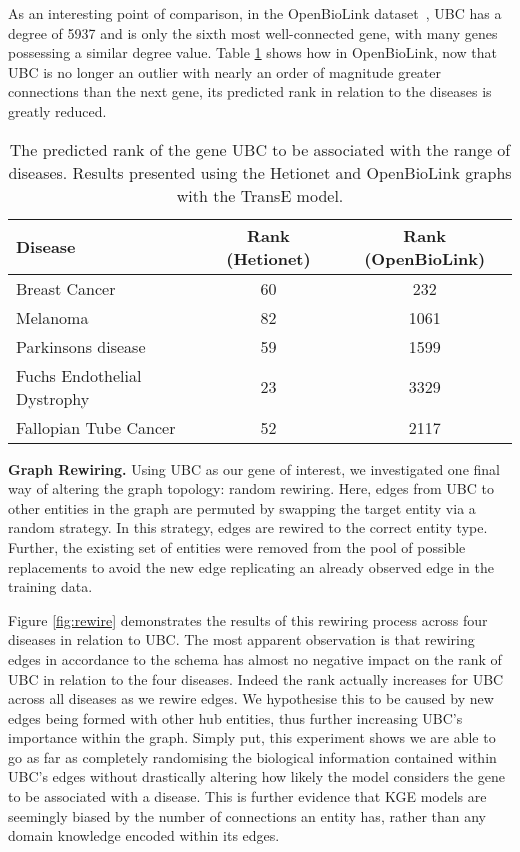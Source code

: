 As an interesting point of comparison, in the OpenBioLink dataset~\cite{breit2020openbiolink}, UBC has a degree of 5937 and is only the sixth most well-connected gene, with many genes possessing a similar degree value. Table \ref{tab:ubc-rank} shows how in OpenBioLink, now that UBC is no longer an outlier with nearly an order of magnitude greater connections than the next gene, its predicted rank in relation to the diseases is greatly reduced.

\begin{table}[ht!]
	\centering
	\begin{tabular}{l c c}
		\toprule
		\textbf{Disease}            & \textbf{Rank (Hetionet)} & \textbf{Rank (OpenBioLink)} \\ \midrule \midrule
		Breast Cancer               & 60                       & 232                         \\
		Melanoma                    & 82                       & 1061                        \\
		Parkinsons disease          & 59                       & 1599                        \\
		Fuchs Endothelial Dystrophy & 23                       & 3329                        \\
		Fallopian Tube Cancer       & 52                       & 2117                        \\
		\bottomrule
	\end{tabular}
	\vspace{5pt}
	\caption{The predicted rank of the gene UBC to be associated with the range of diseases. Results presented using the Hetionet and OpenBioLink graphs with the TransE model.}
	\label{tab:ubc-rank}
\end{table}

\textbf{Graph Rewiring.} Using UBC as our gene of interest, we investigated one final way of altering the graph topology: random rewiring. Here, edges from UBC to other entities in the graph are permuted by swapping the target entity via a random strategy. In this strategy, edges are rewired to the correct entity type. Further, the existing set of entities were removed from the pool of possible replacements to avoid the new edge replicating an already observed edge in the training data.

Figure \ref{fig:rewire} demonstrates the results of this rewiring process across four diseases in relation to UBC. The most apparent observation is that rewiring edges in accordance to the schema has almost no negative impact on the rank of UBC in relation to the four diseases. Indeed the rank actually increases for UBC across all diseases as we rewire edges. We hypothesise this to be caused by new edges being formed with other hub entities, thus further increasing UBC's importance within the graph. Simply put, this experiment shows we are able to go as far as completely randomising the biological information contained within UBC's edges without drastically altering how likely the model considers the gene to be associated with a disease. This is further evidence that KGE models are seemingly biased by the number of connections an entity has, rather than any domain knowledge encoded within its edges.

